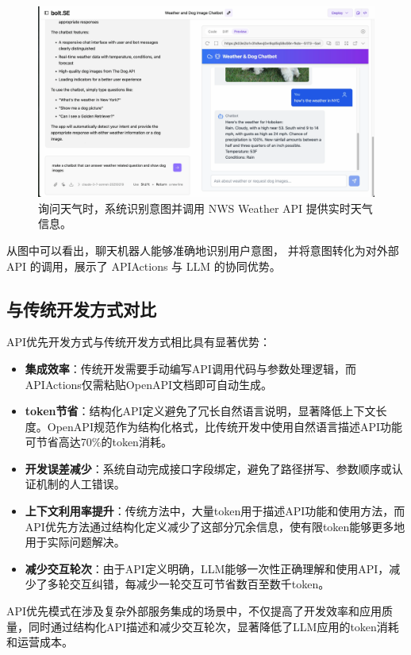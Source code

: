 \begin{figure}[htbp]
  \centering
  \includegraphics[width=\textwidth]{figures/screenshots/api-actions/demo_weather_preview.png}
  \caption{询问天气时，系统识别意图并调用 NWS Weather API 提供实时天气信息。}
  \label{fig:demo_weather}
\end{figure}

从图中可以看出，聊天机器人能够准确地识别用户意图，
并将意图转化为对外部 API 的调用，展示了 APIActions 与 LLM 的协同优势。

\subsection{与传统开发方式对比}

API优先开发方式与传统开发方式相比具有显著优势：

\begin{itemize}
  \item \textbf{集成效率}：传统开发需要手动编写API调用代码与参数处理逻辑，而APIActions仅需粘贴OpenAPI文档即可自动生成。
  
  \item \textbf{token节省}：结构化API定义避免了冗长自然语言说明，显著降低上下文长度。OpenAPI规范作为结构化格式，比传统开发中使用自然语言描述API功能可节省高达70\%的token消耗。
  
  \item \textbf{开发误差减少}：系统自动完成接口字段绑定，避免了路径拼写、参数顺序或认证机制的人工错误。
  
  \item \textbf{上下文利用率提升}：传统方法中，大量token用于描述API功能和使用方法，而API优先方法通过结构化定义减少了这部分冗余信息，使有限token能够更多地用于实际问题解决。
  
  \item \textbf{减少交互轮次}：由于API定义明确，LLM能够一次性正确理解和使用API，减少了多轮交互纠错，每减少一轮交互可节省数百至数千token。
\end{itemize}

API优先模式在涉及复杂外部服务集成的场景中，不仅提高了开发效率和应用质量，同时通过结构化API描述和减少交互轮次，显著降低了LLM应用的token消耗和运营成本。

